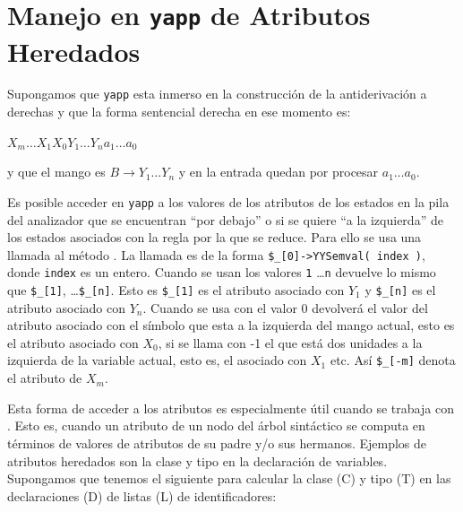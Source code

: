 \section{Manejo en {\tt yapp} de Atributos Heredados}
\label{section:heredados}
Supongamos  que \verb|yapp| esta inmerso 
en la construcción de la antiderivación a derechas y que la forma sentencial
derecha en ese momento es:

\begin{center}
$X_m \ldots X_1 X_0 Y_1 \ldots  Y_n a_1 \ldots a_0$
\end{center}

y que el mango es $B \rightarrow Y_1 \ldots  Y_n$ y en la entrada quedan por 
procesar $a_1 \ldots a_0$.

Es posible acceder en \verb|yapp| a los valores de los atributos de los estados en la pila
del analizador que se encuentran ``por debajo'' o si se quiere
``a la izquierda'' de los estados asociados
con la regla por la que se reduce. Para ello se usa una llamada al método
. La llamada es de la forma 
\verb|$_[0]->YYSemval( index )|, donde \verb|index| es un entero.
Cuando se usan los valores \verb|1| \ldots \verb|n| devuelve lo mismo
que \verb|$_[1]|, \ldots \verb|$_[n]|. Esto es 
\verb|$_[1]| es el atributo asociado con $Y_1$ y \verb|$_[n]| es el atributo
asociado con $Y_n$.  Cuando se usa con el valor
0 devolverá el valor del atributo asociado con el símbolo que esta a la izquierda 
del mango actual, esto es el atributo asociado con $X_0$, 
si se llama con -1 el que está dos unidades a la izquierda de la variable actual, 
esto es, el asociado con $X_1$ etc. Así \verb|$_[-m]| denota el atributo
de $X_m$.

Esta forma de acceder a los atributos es especialmente útil cuando se 
trabaja con . Esto es, cuando un atributo
de un nodo del árbol sintáctico se computa en términos
de valores de atributos de su padre y/o sus hermanos.
Ejemplos de atributos heredados son la clase y tipo en la declaración
de variables. Supongamos que tenemos el siguiente 
 para calcular la clase (C) y tipo (T) en 
las declaraciones (D) de listas (L) de identificadores:

